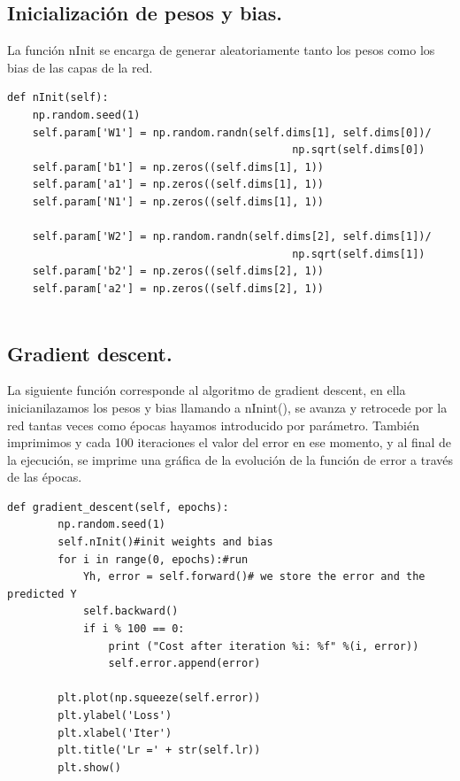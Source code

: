 \documentclass[a4paper,10pt]{article}
\begin{document}
\subsection{Inicialización de pesos y bias.}
\noindent
La función nInit se encarga de generar aleatoriamente tanto los pesos como los bias de las capas de la red.
\begin{lstlisting}
def nInit(self): 
    np.random.seed(1)
    self.param['W1'] = np.random.randn(self.dims[1], self.dims[0])/ 
                                             np.sqrt(self.dims[0]) 
    self.param['b1'] = np.zeros((self.dims[1], 1))   
    self.param['a1'] = np.zeros((self.dims[1], 1))        
    self.param['N1'] = np.zeros((self.dims[1], 1))             
     
    self.param['W2'] = np.random.randn(self.dims[2], self.dims[1])/ 
                                             np.sqrt(self.dims[1]) 
    self.param['b2'] = np.zeros((self.dims[2], 1))     
    self.param['a2'] = np.zeros((self.dims[2], 1))   
      
\end{lstlisting}
\subsection{Gradient descent.}
\noindent
La siguiente función corresponde al algoritmo de gradient descent, en ella inicianilazamos los pesos y bias llamando a nInint(), se avanza y retrocede por la red tantas veces como épocas hayamos introducido por parámetro. También imprimimos y cada 100 iteraciones el valor del error en ese momento, y al final de la ejecución, se imprime una gráfica de la evolución de la función de error a través de las épocas.
\begin{lstlisting}
def gradient_descent(self, epochs):
        np.random.seed(1)                         
        self.nInit()#init weights and bias
        for i in range(0, epochs):#run
            Yh, error = self.forward()# we store the error and the predicted Y
            self.backward()
            if i % 100 == 0:
                print ("Cost after iteration %i: %f" %(i, error)) 
                self.error.append(error) 

        plt.plot(np.squeeze(self.error))
        plt.ylabel('Loss')
        plt.xlabel('Iter')
        plt.title('Lr =' + str(self.lr))
        plt.show()        

\end{lstlisting}
\end{document}
